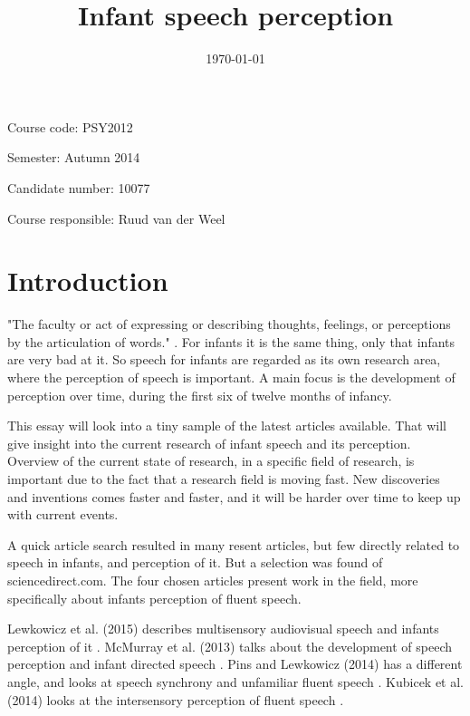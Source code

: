 \documentclass[12pt, a4paper]{article}
\title{
	Infant speech perception
}
\author{
}
\date{\today}
\begin{document}
\onehalfspace
\maketitle
{}

Course code: PSY2012

Semester: Autumn 2014

Candidate number: 10077

Course responsible: Ruud van der Weel

\tableofcontents
\newpage 


\section{Introduction}

"The faculty or act of expressing or describing thoughts, feelings, or
perceptions by the articulation of words." \cite{dspeech}. For infants it is
the same thing, only that infants are very bad at it. So speech for infants are
regarded as its own research area, where the perception of speech is important.
A main focus is the development of perception over time, during the first six
of twelve months of infancy.  

This essay will look into a tiny sample of the latest articles available. That
will give insight into the current research of infant speech and its perception. 
Overview of the current state of research, in a specific field of research, is
important due to the fact that a research field is moving fast. New discoveries
and inventions comes faster and faster, and it will be harder over time to keep
up with current events. 

A quick article search resulted in many resent articles, but few directly
related to speech in infants, and perception of it. But a selection was found
of sciencedirect.com. The four chosen articles present work in the field, more
specifically about infants perception of fluent speech. 

Lewkowicz et al. (2015) describes multisensory audiovisual speech and infants
perception of it \cite{fluentAVspeech}.   
McMurray et al. (2013) talks about the development of speech perception and
infant directed speech \cite{idsdev}. 
Pins and Lewkowicz (2014) has a different angle, and looks at speech synchrony
and unfamiliar fluent speech \cite{speechsynchrony}. 
Kubicek et al. (2014) looks at the intersensory perception of fluent
speech \cite{intersensory}. 
\end{document}
